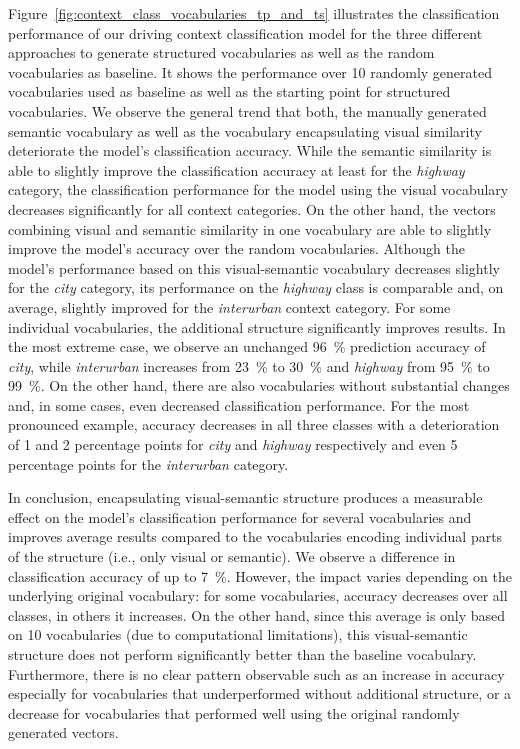 Figure~\ref{fig:context_class_vocabularies_tp_and_ts} illustrates the classification performance of our driving context classification model for the three different approaches to generate structured vocabularies as well as the random vocabularies as baseline. 
It shows the performance over \num{10} randomly generated vocabularies used as baseline as well as the starting point for structured vocabularies.
We observe the general trend that both, the manually generated semantic vocabulary as well as the vocabulary encapsulating visual similarity deteriorate the model's classification accuracy.
While the semantic similarity is able to slightly improve the classification accuracy at least for the \emph{highway} category, the classification performance for the model using the visual vocabulary decreases significantly for all context categories.
On the other hand, the vectors combining visual and semantic similarity in one vocabulary are able to slightly improve the model's accuracy over the random vocabularies.
Although the model's performance based on this visual-semantic vocabulary decreases slightly for the \emph{city} category, its performance on the \emph{highway} class is comparable and, on average, slightly improved for the \emph{interurban} context category.
For some individual vocabularies, the additional structure significantly improves results.
In the most extreme case, we observe an unchanged \SI{96}{\percent} prediction accuracy of \emph{city}, while \emph{interurban} increases from \SI{23}{\percent} to \SI{30}{\percent} and \emph{highway} from \SI{95}{\percent} to \SI{99}{\percent}. 
On the other hand, there are also vocabularies without substantial changes and, in some cases, even decreased classification performance.
For the most pronounced example, accuracy decreases in all three classes with a deterioration of \num{1} and \num{2} percentage points for \emph{city} and \emph{highway} respectively and even \num{5} percentage points for the \emph{interurban} category.

In conclusion, encapsulating visual-semantic structure produces a measurable effect on the model's classification performance for several vocabularies and improves average results compared to the vocabularies encoding individual parts of the structure (i.e., only visual or semantic).
We observe a difference in classification accuracy of up to \SI{7}{\percent}.
However, the impact varies depending on the underlying original vocabulary: for some vocabularies, accuracy decreases over all classes, in others it increases.
On the other hand, since this average is only based on \num{10} vocabularies (due to computational limitations), this visual-semantic structure does not perform significantly better than the baseline vocabulary.
Furthermore, there is no  clear pattern observable such as an increase in accuracy especially for vocabularies that underperformed without additional structure, or a decrease for vocabularies that performed well using the original randomly generated vectors.

